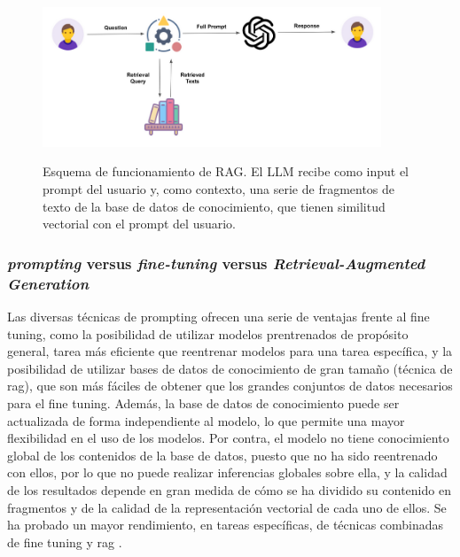 \begin{figure}[H]
    \caption[Esquema de funcionamiento de RAG]{Esquema de funcionamiento de RAG. El LLM recibe como input el {prompt} del usuario y, como contexto, una serie de fragmentos de texto de la base de datos de conocimiento, que tienen similitud vectorial con el {prompt} del usuario.}
    \centering
    \includegraphics[width=0.9\textwidth]{./figuras/rag.png}
    \label{fig:rag}
\end{figure}


\subsubsection{\emph{prompting} versus \emph{fine-tuning} versus \emph{Retrieval-Augmented Generation}}

Las diversas técnicas de {prompting} ofrecen una serie de ventajas frente al {fine tuning}, como la posibilidad de utilizar modelos prentrenados de propósito general, tarea más eficiente que reentrenar modelos para una tarea específica, y la posibilidad de utilizar bases de datos de conocimiento de gran tamaño (técnica de \gls{rag}), que son más fáciles de obtener que los grandes conjuntos de datos necesarios para el {fine tuning}. Además, la base de datos de conocimiento puede ser actualizada de forma independiente al modelo, lo que permite una mayor flexibilidad en el uso de los modelos. Por contra, el modelo  no tiene conocimiento global de los contenidos de la base de datos, puesto que no ha sido reentrenado con ellos, por lo que no puede realizar inferencias globales sobre ella, y la calidad de los resultados depende en gran medida de cómo se ha dividido su contenido en fragmentos y de la calidad de la representación vectorial de cada uno de ellos. Se ha probado un mayor rendimiento, en tareas específicas, de técnicas combinadas de {fine tuning} y \gls{rag} \citep{lewisRetrievalAugmentedGenerationKnowledgeIntensive2021}.




